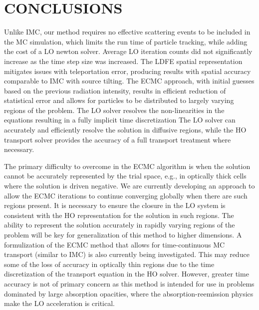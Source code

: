 \documentclass[11pt]{article}
\begin{document}
\section{CONCLUSIONS}

Unlike IMC, our method requires no effective scattering
events to be included in the MC simulation, which limits the run time of particle
tracking, while adding the cost of a LO newton solver. Average LO iteration counts
did not significantly increase as the time step size was increased. The LDFE spatial representation
mitigates issues with teleportation error, producing results with spatial accuracy
comparable to IMC with source tilting.  The ECMC approach, with initial guesses based on the
previous radiation intensity, results in efficient reduction of statistical error and
allows for particles to be distributed to largely varying regions of the problem.
The LO solver resolves the non-linearities in the equations resulting in a fully
implicit time discretization
The LO solver
can accurately and efficiently resolve the solution in diffusive regions, while the HO
transport solver provides the accuracy of a full transport treatment where necessary. 

The primary difficulty to overcome in the ECMC algorithm is when the solution cannot
be accurately represented by the trial space, e.g., in optically thick cells where
the solution is driven negative.   We are currently developing an approach to allow
the ECMC iterations to continue converging globally when there are such regions
present.  It is necessary to ensure the
 closure in the LO system is consistent with the HO
representation for the solution in such regions.  The ability to represent the solution accurately in
rapidly varying regions of the problem will be key for generalization of this method
to higher dimensions.  A formulization of the ECMC method
that allows for time-continuous MC transport (similar to IMC) is also currently being
investigated.  This may reduce some of the loss of accuracy in optically thin regions
due to the time discretization of the transport equation in the HO solver.
However, greater time accuracy is not of primary concern as this method is intended
for use in problems dominated by large absorption opacities, where the
absorption-reemission physics make the LO acceleration is critical.  
\end{document}
